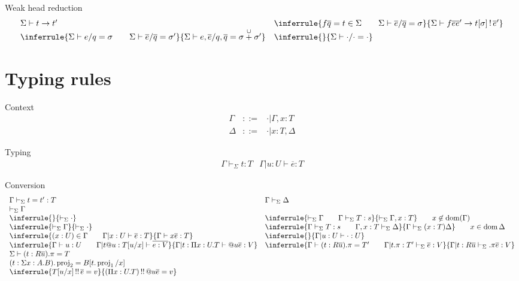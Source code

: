 \documentclass[acmlarge]{acmart}\settopmatter{}
\DeclareMathOperator{\dom}{dom}
\DeclareMathOperator{\proj}{proj}
\renewcommand{\|}{|}
\begin{document}
Weak head reduction
\[
\begin{array}{ll}
\Sigma \vdash t \to t' &
\inferrule{f \overline q = t \in \Sigma \qquad \Sigma \vdash \overline{e}/\overline{q} = \sigma}
{\Sigma \vdash f \overline{e} \overline{e}' \to t[\sigma] \bang \overline{e}'}
\\
\inferrule{\Sigma \vdash e/q = \sigma \qquad \Sigma \vdash \overline{e}/\overline{q} = \sigma'}
{\Sigma \vdash e, \overline{e}/q, \overline{q} = \sigma \overset{\cup}{+} \sigma'}%
&
\inferrule{}
{\Sigma \vdash \cdot/\cdot = \cdot} %
\end{array}
\]


\section{Typing rules}
\label{sec:typing}

Context 
\[
\begin{array}{lcl}
\Gamma & ::= & \cdot \| \Gamma, x:T \\
\Delta & ::= & \cdot \| x:T, \Delta
\end{array}
\]

Typing 
\[
\begin{array}{ll}
\Gamma \vdash_\Sigma t : T & \Gamma \| u: U \vdash \overline{e} : T
\end{array}
\]

Conversion 
\[
\begin{array}{ll}
\Gamma \vdash_\Sigma t = t' : T & \Gamma \vdash_\Sigma \Delta \\
\vdash_\Sigma \Gamma & \\

\inferrule{}
{\vdash_\Sigma \cdot} & 
\inferrule{\vdash_\Sigma \Gamma \qquad \Gamma \vdash_\Sigma T:s}
{\vdash_\Sigma \Gamma, x : T} \qquad x \not\in \dom(\Gamma) \\

\inferrule{\vdash_\Sigma \Gamma}
{\vdash_\Sigma \cdot} &
\inferrule{\Gamma \vdash_\Sigma T : s \qquad \Gamma, x:T \vdash_\Sigma \Delta}
{\Gamma \vdash_\Sigma (x:T) \Delta}
\qquad x \in \dom{\Delta} \\

\inferrule{(x:U)\in \Gamma \qquad \Gamma | x:U \vdash \overline{e}:T}
{\Gamma \vdash x \overline{e} : T} 
&
\inferrule{}
{\Gamma \| u:U \vdash \cdot : U}
\\
\inferrule{\Gamma \vdash u:U \qquad \Gamma \| t@u:T[u/x] \vdash \overline{e : V}}
{\Gamma \| t : \Pi x:U.T \vdash @u \overline{e}:V}
&
\inferrule{ \Gamma \vdash (t:R\overline{u}).\pi = T' 
\qquad \Gamma \| t.\pi :T' \vdash_\Sigma \overline{e}:V}
{ \Gamma \| t : R \overline{u}  \vdash_\Sigma .\pi \overline{e}:V}
\\
\Sigma \vdash (t:R\overline{u}).\pi = T
\\
(t: \Sigma x:A.B).\proj_2 = B[t.\proj_1/x] &
\\
\inferrule{T[u/x] \twobang \overline{e} = v}
{(\Pi x:U.T) \twobang @ u \overline{e} = v}
\end{array}
\]
\end{document}
